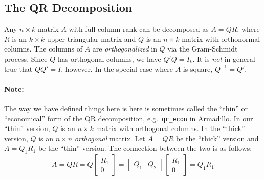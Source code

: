 \subsection{The QR Decomposition}
Any $n\times k$ matrix $A$ with full column rank can be decomposed as $A = QR$, where $R$ is an $k\times k$ upper triangular matrix and $Q$ is an $n\times k$ matrix with orthonormal columns. 
The columns of $A$ are \emph{orthogonalized} in $Q$ via the Gram-Schmidt process. 
Since $Q$ has orthogonal columns, we have $Q'Q = I_k$. 
It is \emph{not} in general true that $QQ' = I$, however. 
In the special case where $A$ is square, $Q^{-1} = Q'$.

\paragraph{Note:} The way we have defined things here is here is sometimes called the ``thin'' or ``economical'' form of the QR decomposition, e.g.\ \texttt{qr\_econ} in Armadillo. 
In our ``thin'' version, $Q$ is an $n\times k$ matrix with orthogonal columns. 
In the ``thick'' version, $Q$ is an $n\times n$ \emph{orthogonal} matrix.
Let $A = QR$ be the ``thick'' version and $A = Q_1 R_1$ be the ``thin'' version. 
The connection between the two is as follows:
  $$A = QR = Q \left[\begin{array}
    {c} R_1 \\ 0 
  \end{array} \right] = \left[  \begin{array}
    {cc} Q_1 & Q_2
  \end{array}\right]\left[\begin{array}
    {c} R_1 \\ 0 
  \end{array} \right] = Q_1 R_1$$

